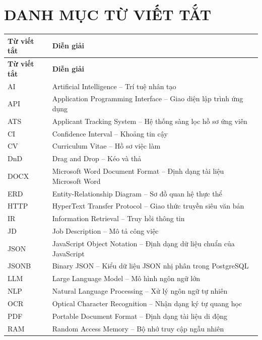 \documentclass[../DoAn.tex]{subfiles}
\begin{document}
{}
\chapter*{DANH MỤC TỪ VIẾT TẮT}

\renewcommand{\arraystretch}{1.25}
\begin{longtable}{|l|p{11cm}|}
\hline
\textbf{Từ viết tắt} & \textbf{Diễn giải} \\ \hline
\endfirsthead
\hline
\textbf{Từ viết tắt} & \textbf{Diễn giải} \\ \hline
\endhead
\hline
\endfoot
AI       & Artificial Intelligence -- Trí tuệ nhân tạo \\ \hline
API      & Application Programming Interface -- Giao diện lập trình ứng dụng \\ \hline
ATS      & Applicant Tracking System -- Hệ thống sàng lọc hồ sơ ứng viên \\ \hline
CI       & Confidence Interval -- Khoảng tin cậy \\ \hline
CV       & Curriculum Vitae -- Hồ sơ việc làm \\ \hline
DnD      & Drag and Drop -- Kéo và thả \\ \hline
DOCX     & Microsoft Word Document Format -- Định dạng tài liệu Microsoft Word \\ \hline
ERD      & Entity-Relationship Diagram -- Sơ đồ quan hệ thực thể \\ \hline
HTTP     & HyperText Transfer Protocol -- Giao thức truyền siêu văn bản \\ \hline
IR       & Information Retrieval -- Truy hồi thông tin \\ \hline
JD       & Job Description -- Mô tả công việc \\ \hline
JSON     & JavaScript Object Notation -- Định dạng dữ liệu chuẩn của JavaScript \\ \hline
JSONB    & Binary JSON -- Kiểu dữ liệu JSON nhị phân trong PostgreSQL \\ \hline
LLM      & Large Language Model -- Mô hình ngôn ngữ lớn \\ \hline
NLP      & Natural Language Processing -- Xử lý ngôn ngữ tự nhiên \\ \hline
OCR      & Optical Character Recognition -- Nhận dạng ký tự quang học \\ \hline
PDF      & Portable Document Format -- Định dạng tài liệu di động \\ \hline
RAM      & Random Access Memory -- Bộ nhớ truy cập ngẫu nhiên \\ \hline

\end{longtable}
\end{document}
